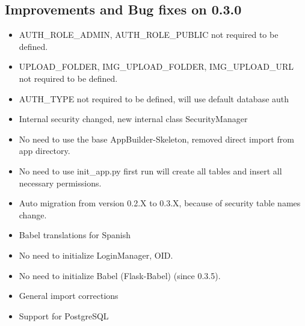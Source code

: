 \documentclass[letterpaper,10pt,english]{sphinxmanual}
\begin{document}
\subsection{Improvements and Bug fixes on 0.3.0}
\label{versions:improvements-and-bug-fixes-on-0-3-0}\begin{itemize}
\item {} 
AUTH\_ROLE\_ADMIN, AUTH\_ROLE\_PUBLIC not required to be defined.

\item {} 
UPLOAD\_FOLDER, IMG\_UPLOAD\_FOLDER, IMG\_UPLOAD\_URL not required to be defined.

\item {} 
AUTH\_TYPE not required to be defined, will use default database auth

\item {} 
Internal security changed, new internal class SecurityManager

\item {} 
No need to use the base AppBuilder-Skeleton, removed direct import from app directory.

\item {} 
No need to use init\_app.py first run will create all tables and insert all necessary permissions.

\item {} 
Auto migration from version 0.2.X to 0.3.X, because of security table names change.

\item {} 
Babel translations for Spanish

\item {} 
No need to initialize LoginManager, OID.

\item {} 
No need to initialize Babel (Flask-Babel) (since 0.3.5).

\item {} 
General import corrections

\item {} 
Support for PostgreSQL

\end{itemize}
\end{document}
